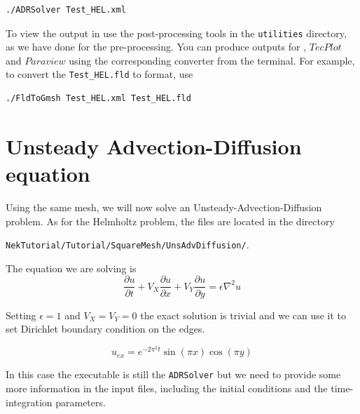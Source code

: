 \documentclass[a4paper,12pt]{article}
\begin{document}
\begin{verbatim}
./ADRSolver Test_HEL.xml
\end{verbatim}

To view the output in \gmsh use the post-processing
tools in the \texttt{utilities} directory, as we have done for the
pre-processing. You can produce outputs for \gmsh, $TecPlot$ and $Paraview$
using the corresponding converter from the terminal. For example, to convert the
\texttt{Test\_HEL.fld} to \gmsh format, use

\begin{verbatim}
./FldToGmsh Test_HEL.xml Test_HEL.fld
\end{verbatim} 


\clearpage
\section{Unsteady Advection-Diffusion equation}

Using the same mesh, we will now solve an Unsteady-Advection-Diffusion
problem. As for the Helmholtz problem, the files are located in the directory

\texttt{NekTutorial/Tutorial/SquareMesh/UnsAdvDiffusion/}.

The equation we are solving is
\begin{equation}
\frac{\partial u}{\partial t} + V_X \frac{\partial u}{\partial x} 
    + V_Y \frac{\partial u}{\partial y} = \epsilon \nabla^2 u
\end{equation}

Setting $\epsilon = 1$ and $V_X=V_Y=0$ the exact solution is trivial
and we can use it to set Dirichlet boundary condition on the edges.

\begin{equation}
u_{ex}= e^{-2\pi^2 t}\sin(\pi x)\cos(\pi y)
\end{equation}

In this case the executable is still the \texttt{ADRSolver} but we need to
provide some more information in the input files, including the initial
conditions and the time-integration parameters.
\end{document}
